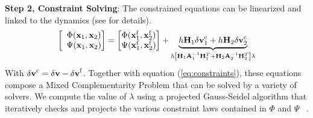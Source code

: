 \textbf{Step 2, Constraint Solving}: 
The constrained equations can be linearized and linked to the dynamics (see \cite{CJADLC10} for details). 
\begin{equation}
\left[
\begin{array}{c}
\Phi(\Vx_{1}, \Vx_{2})  \\
\Psi(\Vx_{1}, \Vx_{2}) 
\end{array} \! \! \!
\right]
 =
\left[ \! \! \!
\begin{array}{c}
\Phi(\Vx_{1}^{\mathrm{f}}, \Vx_{2}^{\mathrm{f}})  \\
\Psi(\Vx_{1}^{\mathrm{f}}, \Vx_{2}^{\mathrm{f}}) 
\end{array}\! \! \!
\right]
 + 
 \underbrace{
 h\mathbf{H}_1\Vdv_1^{\mathrm{c}}  +  h\mathbf{H}_2\Vdv_2^{\mathrm{c}}
 }_{h \left[  \mathbf{H}_1 \mathbf{A}_1^{-1}  \mathbf{H}_1^T + \mathbf{H}_2 \mathbf{A}_2^{-1}  \mathbf{H}_2^T \right]\lambda
 }
\label{eq:addjminvjt}
\end{equation}
With $\mathbf{\delta\mathbf{v } }^{\mathrm{c}} = \mathbf{\delta\mathbf{v } } - \mathbf{\delta\mathbf{v } }^{\mathrm{f}}$. 
Together with equation (\ref{eq:constraints}), these equations compose a Mixed Complementarity Problem that can be solved by a variety of solvers.
We compute the value of $ \lambda$ using a projected Gauss-Seidel algorithm that iteratively checks and projects the various constraint laws contained in $\Phi$ and  $\Psi$ ~\cite{DGMCG09}. 

